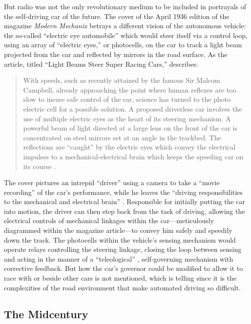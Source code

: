 But radio was not the only revolutionary medium to be included in
 portrayals of the self-driving car of the future. The cover of the
 April 1936 \cite{modernmechanix} edition of the magazine \emph{Modern
   Mechanix} betrays a 
 different vision of the autonomous vehicle: the so-called ``electric
 eye automobile'' which would steer itself via a control loop, using an
 array of ``electric eyes,'' or photocells, on the car to track a light
 beam projected from the car and reflected by mirrors in the road
 surface. As the article, titled ``Light Beams Steer Super Racing
 Cars,'' describes:
\begin{quote}
With speeds, such as recently attained by the famous Sir Malcom
Campbell, already approaching the point where human reflexes are too
slow to insure safe control of the car, science has turned to the
photo electric cell for a possible solution. A proposed driverless car
involves the use of multiple electric eyes as the heart of its
steering mechanism. A powerful beam of light directed at a large lens
on the front of the car is concentrated on steel mirrors set at an
angle in the trackbed. The reflections are ``caught'' by the electric
eyes which convey the electrical impulses to a mechanical-electrical
brain which keeps the speeding car on its course \cite[p. 71]{lightbeams}.
\end{quote}

The cover pictures an intrepid ``driver'' using a camera to take a
``movie recording'' of the car's performance, while he leaves the
``driving responsibilities to the mechanical and electrical brain''
\cite[p. 71]{lightbeams}.
Responsible for initially putting the car into motion, the driver can
then step back from the task of driving, allowing the electrical
controls of mechanical linkages within the car---meticulously diagrammed
within the magazine article---to convey him safely and speedily down
the track. The photocells within the vehicle's sensing mechanism would
operate relays controlling the steering linkage, closing the loop
between sensing and acting in the manner of a ``teleological''
\cite{behaviorPurpose}, 
self-governing mechanism with corrective feedback. But how
the car's governor could be modified to allow it to race with or
beside other cars is not mentioned, which is telling since it is the
complexities of the road environment that make automated driving so difficult.

\subsection{The Midcentury}

